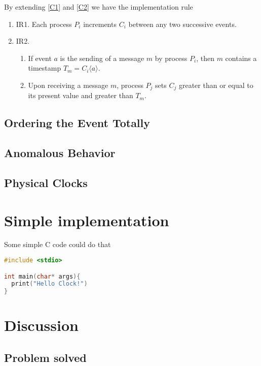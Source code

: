 \documentclass[12pt,a4paper,oneside]{article}
\begin{document}
By extending \ref{C1} and \ref{C2} we have the implementation rule

\begin{enumerate}
  \item \label{IR1} IR1. Each process $P_i$ increments $C_i$ between any two successive events\cite{l}.
  \item \label{IR2} IR2.
  \begin{enumerate}
    \item If event $a$ is the sending of a message $m$ by process $P_i$, then $m$ contains a timestamp $T_m=C_i\langle a \rangle$\cite{l}.
    \item Upon receiving a message $m$, process $P_j$ sets $C_j$ greater than or equal to its present value and greater than $T_m$\cite{l}.
  \end{enumerate}
\end{enumerate}

\subsection{Ordering the Event Totally}

\subsection{Anomalous Behavior}

\subsection{Physical Clocks}

\section{Simple implementation}

Some simple C code could do that

\begin{lstlisting}[language=C]
#include <stdio>

int main(char* args){
  print("Hello Clock!")
}
\end{lstlisting}

\section{Discussion}

\subsection{Problem solved}
\end{document}
